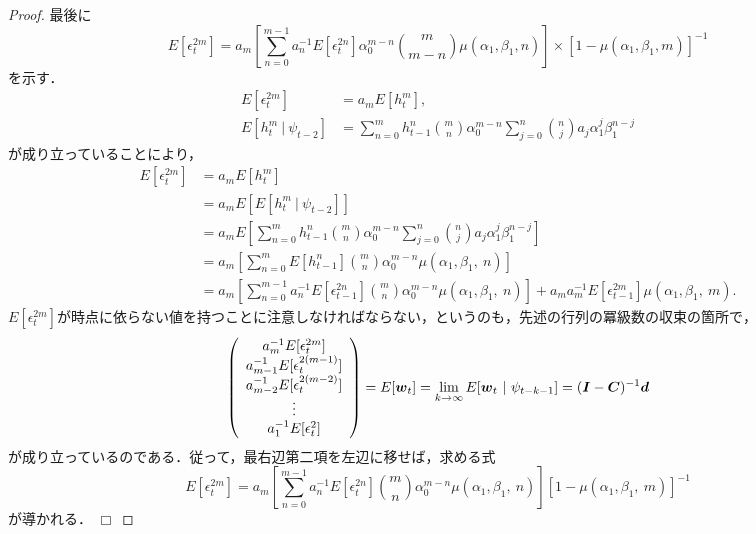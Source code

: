 \documentclass[8pt]{jsarticle}
\newtheorem{proof}{証明}
\def\qed{\hfill $\Box$}
\def\vector#1{\mbox{\boldmath $#1$}}
\begin{document}
\begin{proof}
最後に
\[
	E[\epsilon_t^{2m}] = a_m \left[ \sum_{n=0}^{m-1} a_n^{-1} E[\epsilon_t^{2n}] \alpha_0^{m-n} \binom{m}{m-n} \mu(\alpha_1, \beta_1, n) \right]
		\times \left[ 1-\mu(\alpha_1, \beta_1, m) \right]^{-1}
\]
を示す．
\begin{align*}
	E[\epsilon_t^{2m}] &= a_m E[h_t^m], \\
	E[h_t^m\ |\ \psi_{t-2}] &= \sum_{n=0}^{m}　h_{t-1}^n \binom{m}{n} \alpha_0^{m-n} \sum_{j=0}^{n} \binom{n}{j} a_j \alpha_1^j \beta_1^{n-j}
\end{align*}
が成り立っていることにより，
\begin{align*}
	E[\epsilon_t^{2m}] &= a_m E[h_t^m] \\
	&= a_m E\left[ E[h_t^m\ |\ \psi_{t-2}] \right] \\
	&= a_m E\left[ \sum_{n=0}^{m}　h_{t-1}^n \binom{m}{n} \alpha_0^{m-n} \sum_{j=0}^{n} \binom{n}{j} a_j \alpha_1^j \beta_1^{n-j} \right] \\
	&= a_m \left[ \sum_{n=0}^{m}　E[h_{t-1}^n] \binom{m}{n} \alpha_0^{m-n} \mu(\alpha_1,\beta_1,\ n) \right] \\
	&= a_m \left[ \sum_{n=0}^{m-1}　a_n^{-1} E[\epsilon_{t-1}^{2n}] \binom{m}{n} \alpha_0^{m-n} \mu(\alpha_1,\beta_1,\ n) \right] + a_m a_m^{-1}  E[\epsilon_{t-1}^{2m}] \mu(\alpha_1,\beta_1,\ m).
\end{align*}
$E[\epsilon_t^{2m}] が時点に依らない値を持つことに注意しなければならない，というのも，先述の行列の冪級数の収束の箇所で，$
\[
	\left(
	\begin{array}{c}
		a_m^{-1} E[\epsilon_t^{2m}] \\
		a_{m-1}^{-1} E[\epsilon_t^{2(m-1)}] \\
		a_{m-2}^{-1} E[\epsilon_t^{2(m-2)}] \\
		\vdots \\
		a_1^{-1} E[\epsilon_t^2]
	\end{array}
	\right)
	= E[\vector{w}_t] = \lim_{k \to \infty} E[\vector{w}_t\ |\ \psi_{t-k-1}] = (\vector{I} - \vector{C})^{-1} \vector{d}
\]
が成り立っているのである．従って，最右辺第二項を左辺に移せば，求める式
\[
	E[\epsilon_t^{2m}] = a_m \left[ \sum_{n=0}^{m-1}　a_n^{-1} E[\epsilon_t^{2n}] \binom{m}{n} \alpha_0^{m-n} \mu(\alpha_1,\beta_1,\ n) \right] [1 - \mu(\alpha_1,\beta_1,\ m)]^{-1}
\]
が導かれる．
\qed
\end{proof}
\end{document}
